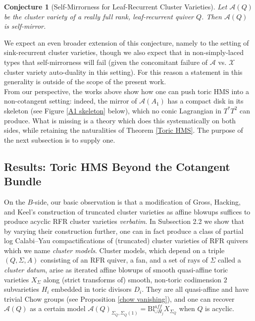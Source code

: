 \documentclass[11pt]{amsart}
\newtheorem{conj}[thm]{Conjecture}
\theoremstyle{definition}
\theoremstyle{remark}
\numberwithin{equation}{section}
\begin{document}
\begin{conj}[Self-Mirrorness for Leaf-Recurrent Cluster Varieties]\label{leaf rec HMS}
    Let $\mathcal{A}(Q)$ be the cluster variety of a really full rank, leaf-recurrent quiver $Q$. Then $\mathcal{A}(Q)$ is self-mirror.
\end{conj}

We expect an even broader extension of this conjecture, namely to the setting of sink-recurrent cluster varieties, though we also expect that in non-simply-laced types that self-mirrorness will fail (given the concomitant failure of $\mathcal{A}$ vs. $\mathcal{X}$ cluster variety auto-duality in this setting). For this reason a statement in this generality is outside of the scope of the present work.\\

From our perspective, the works above show how one can push toric HMS into a non-cotangent setting: indeed, the mirror of $\mathcal A(A_1)$ has a compact disk in its skeleton (see Figure \ref{A1 skeleton} below), which no conic Lagrangian in $T^*T^2$ can produce. What is missing is a theory which does this systematically on both sides, while retaining the naturalities of Theorem \ref{Toric HMS}. The purpose of the next subsection is to supply one.

\subsection{Results: Toric HMS Beyond the Cotangent Bundle}

On the $B$-side, our basic observation is that a modification of Gross, Hacking, and Keel's construction of truncated cluster varieties as affine blowups suffices to produce acyclic RFR cluster varieties \textit{verbatim}. In Subsection 2.2 we show that by varying their construction further, one can in fact produce a class of partial log Calabi–Yau compactifications of (truncated) cluster varieties of RFR quivers which we name \textit{cluster models}. Cluster models, which depend on a triple $(Q, \Sigma, A)$ consisting of an RFR quiver, a fan, and a set of rays of $\Sigma$ called a \textit{cluster datum}, arise as iterated affine blowups of smooth quasi-affine toric varieties $X_\Sigma$ along (strict transforms of) smooth, non-toric codimension $2$ subvarieties $H_i$ embedded in toric divisors $D_i$. They are all quasi-affine and have trivial Chow groups (see Proposition \ref{chow vanishing}), and one can recover $\mathcal{A}(Q)$ as a certain model $\mathcal{A}(Q)_{\Sigma_Q,\Sigma_Q(1)} = \mathrm{Bl}^{aff}_{\cup H_j} X_{\Sigma_Q}$ when $Q$ is acyclic.\\
\end{document}
